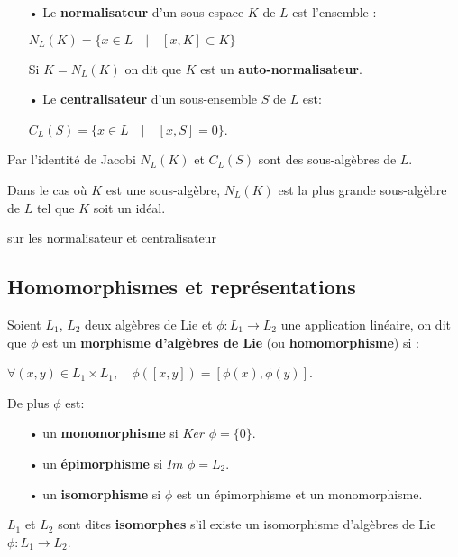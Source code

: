 \documentclass[a4paper,openany,12pt]{report}
\theoremstyle{break}
{\theorembodyfont{\upshape}
\newtheorem*{rmq}{Remarque :}
\newtheorem*{prv}{Preuve :}
\newtheorem*{ex}{Exemples :}
\newtheorem*{exe}{Exemple : }
\newtheorem*{nota}{Notation :}
\newtheorem*{dem}{D\'emonstration :}}
\begin{document}
\begin{df}
\begin{itemize}

\item[•] Le \textbf{normalisateur} d'un sous-espace $K$ de $L$ est l'ensemble : 
 \begin{center}
$ N_{L}(K)=\{x \in L \quad |\quad [x,K] \subset K \} $ 
 \end{center}
Si $K = N_{L}(K)$ on dit que $K$ est un \textbf{auto-normalisateur}.

\item[•] Le \textbf{centralisateur} d'un sous-ensemble $S$ de $L$ est:
\begin{center}
$C_{L}(S) = \{x \in L\quad  | \quad [x,S]=0\}$.

\end{center} 
\end{itemize}
\end{df}

\begin{rmq} 
\quad Par l’identité de Jacobi $N_L(K)$ et $C_L(S)$ sont des sous-algèbres de $L$.

Dans le cas où $K$ est une sous-algèbre, $N_{L}(K)$ est la plus grande sous-algèbre de $L$ tel que $K$ soit un idéal.
\end{rmq}

\begin{exe}
sur les normalisateur et centralisateur
\end{exe}

\subsection{Homomorphismes et représentations}

\begin{df}
Soient $L_{1}$, $L_{2}$ deux algèbres de Lie et $\phi: L_{1} \rightarrow L_{2}$ une application linéaire, on dit que $\phi$ est un \textbf{morphisme d'algèbres de Lie} (ou \textbf{homomorphisme}) si :
\begin{center}
$ \forall(x, y) \in L_{1} \times L_{1}, \quad \phi([x, y])=[\phi(x), \phi(y)]$.
\end{center}
De plus $\phi$ est:
\begin{itemize}
\item[•] un \textbf{monomorphisme} si $Ker$ $\phi = \{ 0 \}$.
\item[•] un \textbf{épimorphisme} si $Im$ $\phi = L_{2}$.
\item[•] un \textbf{isomorphisme} si $\phi$ est un épimorphisme et un monomorphisme.
\end{itemize}
$L_{1}$ et $L_{2}$ sont dites \textbf{isomorphes} s'il existe un isomorphisme d'algèbres de Lie $\phi: L_{1} \rightarrow L_{2}$.  
\end{df}
\end{document}
